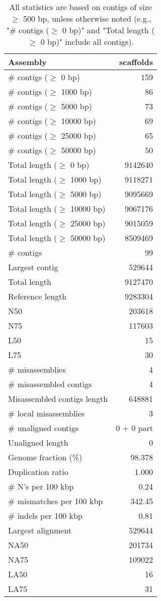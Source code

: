 \documentclass[12pt,a4paper]{article}
\begin{document}
\begin{table}[ht]
\begin{center}
\caption{All statistics are based on contigs of size $\geq$ 500 bp, unless otherwise noted (e.g., "\# contigs ($\geq$ 0 bp)" and "Total length ($\geq$ 0 bp)" include all contigs).}
\begin{tabular}{|l*{1}{|r}|}
\hline
Assembly & scaffolds \\ \hline
\# contigs ($\geq$ 0 bp) & 159 \\ \hline
\# contigs ($\geq$ 1000 bp) & 86 \\ \hline
\# contigs ($\geq$ 5000 bp) & 73 \\ \hline
\# contigs ($\geq$ 10000 bp) & 69 \\ \hline
\# contigs ($\geq$ 25000 bp) & 65 \\ \hline
\# contigs ($\geq$ 50000 bp) & 50 \\ \hline
Total length ($\geq$ 0 bp) & 9142640 \\ \hline
Total length ($\geq$ 1000 bp) & 9118271 \\ \hline
Total length ($\geq$ 5000 bp) & 9095669 \\ \hline
Total length ($\geq$ 10000 bp) & 9067176 \\ \hline
Total length ($\geq$ 25000 bp) & 9015059 \\ \hline
Total length ($\geq$ 50000 bp) & 8509469 \\ \hline
\# contigs & 99 \\ \hline
Largest contig & 529644 \\ \hline
Total length & 9127470 \\ \hline
Reference length & 9283304 \\ \hline
N50 & 203618 \\ \hline
N75 & 117603 \\ \hline
L50 & 15 \\ \hline
L75 & 30 \\ \hline
\# misassemblies & 4 \\ \hline
\# misassembled contigs & 4 \\ \hline
Misassembled contigs length & 648881 \\ \hline
\# local misassemblies & 3 \\ \hline
\# unaligned contigs & 0 + 0 part \\ \hline
Unaligned length & 0 \\ \hline
Genome fraction (\%) & 98.378 \\ \hline
Duplication ratio & 1.000 \\ \hline
\# N's per 100 kbp & 0.24 \\ \hline
\# mismatches per 100 kbp & 342.45 \\ \hline
\# indels per 100 kbp & 0.81 \\ \hline
Largest alignment & 529644 \\ \hline
NA50 & 201734 \\ \hline
NA75 & 109022 \\ \hline
LA50 & 16 \\ \hline
LA75 & 31 \\ \hline
\end{tabular}
\end{center}
\end{table}
\end{document}
